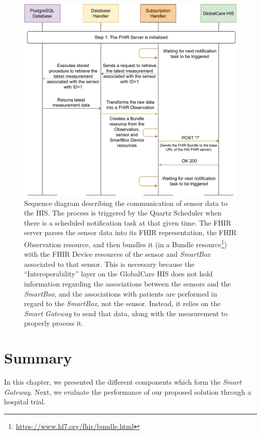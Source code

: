 \begin{figure}[H]
    \centering
    \includegraphics[width=\linewidth]{images/fhir post bundle.pdf}
    \caption[Sequence diagram describing the communication of sensor data to the \acs{HIS}.]{Sequence diagram describing the communication of sensor data to the \acs{HIS}. The process is triggered by the Quartz Scheduler when there is a scheduled notification task at that given time. The \acs{FHIR} server parses the sensor data into its \acs{FHIR} representation, the \acs{FHIR} Observation resource, and then bundles it (in a Bundle resource\footnote{\url{https://www.hl7.org/fhir/bundle.html}}) with the \acs{FHIR} Device resources of the sensor and \textit{SmartBox} associated to that sensor. This is necessary because the ``Interoperability'' layer on the GlobalCare \acs{HIS} does not hold information regarding the associations between the sensors and the \textit{SmartBox}, and the associations with patients are performed in regard to the \textit{SmartBox}, not the sensor. Instead, it relies on the \textit{Smart Gateway} to send that data, along with the measurement to properly process it.}
    \label{fig:fhir-post-bundle}
\end{figure} 

\section{Summary}

In this chapter, we presented the different components which form the \textit{Smart Gateway}. 
Next, we evaluate the performance of our proposed solution through a hospital trial.